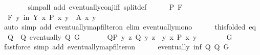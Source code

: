 \begin{isabellebody}
\ \ \ \ \ \ \isamarkupfalse%
{\isacharparenleft}{\kern0pt}simp{\isacharunderscore}{\kern0pt}all\ add{\isacharcolon}{\kern0pt}\ eventually{\isacharunderscore}{\kern0pt}conj{\isacharunderscore}{\kern0pt}iff\ split{\isacharunderscore}{\kern0pt}def{\isacharparenright}{\kern0pt}\isanewline
\ \ \ \ \isamarkupfalse%
\ P{\isacharprime}{\kern0pt}\ F\ \isamarkupfalse%
\ {\isachardoublequoteopen}{\isasymforall}\isactrlsub F\ y\ in\ {\isacharquery}{\kern0pt}Y{}{\isachardot}{\kern0pt}\ {\isasymexists}x{\isachardot}{\kern0pt}\ P\ {\isacharparenleft}{\kern0pt}x{\isacharcomma}{\kern0pt}\ y{\isacharparenright}{\kern0pt}\ {\isasymand}\ A\ x\ y{\isachardoublequoteclose}\isanewline
\ \ \ \ \ \ \isamarkupfalse%
{\isacharparenleft}{\kern0pt}auto\ simp\ add{\isacharcolon}{\kern0pt}\ eventually{\isacharunderscore}{\kern0pt}map{\isacharunderscore}{\kern0pt}filter{\isacharunderscore}{\kern0pt}on\ elim{\isacharbang}{\kern0pt}{\isacharcolon}{\kern0pt}\ eventually{\isacharunderscore}{\kern0pt}mono{\isacharparenright}{\kern0pt}\isanewline
\ \ \ \ \isamarkupfalse%
\ this{\isacharbrackleft}{\kern0pt}folded\ eq{\isacharbrackright}{\kern0pt}\ \isamarkupfalse%
\ Q{\isacharprime}{\kern0pt}{\isacharprime}{\kern0pt}\ \ Q{\isacharprime}{\kern0pt}{\isacharprime}{\kern0pt}{\isacharcolon}{\kern0pt}\ {\isachardoublequoteopen}eventually\ Q{\isacharprime}{\kern0pt}{\isacharprime}{\kern0pt}\ G{\isachardoublequoteclose}\isanewline
\ \ \ \ \ \ \ Q{\isacharprime}{\kern0pt}{\isacharprime}{\kern0pt}P{\isacharcolon}{\kern0pt}\ {\isachardoublequoteopen}{\isacharbraceleft}{\kern0pt}y{\isachardot}{\kern0pt}\ {\isasymexists}z{\isachardot}{\kern0pt}\ Q{\isacharprime}{\kern0pt}{\isacharprime}{\kern0pt}\ {\isacharparenleft}{\kern0pt}y{\isacharcomma}{\kern0pt}\ z{\isacharparenright}{\kern0pt}{\isacharbraceright}{\kern0pt}\ {\isasymsubseteq}\ {\isacharbraceleft}{\kern0pt}y{\isachardot}{\kern0pt}\ {\isasymexists}x{\isachardot}{\kern0pt}\ {\isacharquery}{\kern0pt}P\ {\isacharparenleft}{\kern0pt}x{\isacharcomma}{\kern0pt}\ y{\isacharparenright}{\kern0pt}{\isacharbraceright}{\kern0pt}{\isachardoublequoteclose}\isanewline
\ \ \ \ \ \ \isamarkupfalse%
\ G\ \isamarkupfalse%
{\isacharparenleft}{\kern0pt}fastforce\ simp\ add{\isacharcolon}{\kern0pt}\ eventually{\isacharunderscore}{\kern0pt}map{\isacharunderscore}{\kern0pt}filter{\isacharunderscore}{\kern0pt}on{\isacharparenright}{\kern0pt}\isanewline
\ \ \ \ \isamarkupfalse%
\ {\isachardoublequoteopen}eventually\ {\isacharparenleft}{\kern0pt}inf\ Q{\isacharprime}{\kern0pt}{\isacharprime}{\kern0pt}\ {\isacharquery}{\kern0pt}Q{\isacharparenright}{\kern0pt}\ G{\isachardoublequoteclose}\ \isamarkupfalse%

\end{isabellebody}
